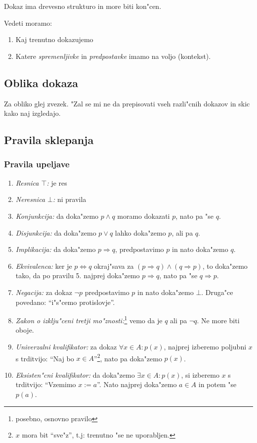 Dokaz ima drevesno strukturo in more biti kon"cen.

Vedeti moramo:
\begin{enumerate}
	\item Kaj trenutno dokazujemo
	\item Katere \emph{spremenljivke} in \emph{predpostavke} imamo na voljo (kontekst).
\end{enumerate}

\subsection{Oblika dokaza}
Za obliko glej zvezek. "Zal se mi ne da prepisovati vseh razli"cnih dokazov in skic kako naj izgledajo.

\subsection{Pravila sklepanja}
\subsubsection{Pravila upeljave}
\begin{enumerate}
	\item \emph{Resnica $\top$:} je res
	\item \emph{Neresnica $\bot$:} ni pravila
	\item \emph{Konjunkcija:} da doka"zemo $p \land q$ moramo dokazati $p$, nato pa "se $q$.
	\item \emph{Disjunkcija:} da doka"zemo $p \lor q$ lahko doka"zemo $p$, ali pa $q$.
	\item \emph{Implikacija:} da doka"zemo $p \Rightarrow q$, predpostavimo $p$ in nato doka"zemo $q$.
	\item \emph{Ekvivalenca:} ker je $p \Leftrightarrow q$ okraj"sava za $(p \Rightarrow q) \land (q \Rightarrow p)$, to doka"zemo tako, da po pravilu 5. najprej doka"zemo $p \Rightarrow q$, nato pa "se $q \Rightarrow p$.
	\item \emph{Negacija:} za dokaz $\lnot p$ predpostavimo $p$ in nato doka"zemo $\bot$. Druga"ce povedano: ``i"s"cemo protislovje''.
	\item \emph{Zakon o izklju"ceni tretji mo"znosti:}\footnote{posebno, osnovno pravilo} vemo da je $q$ ali pa $\lnot q$. Ne more biti oboje.
	\item \emph{Univerzalni kvalifikator:} za dokaz $\forall x \in A: p(x)$, najprej izberemo poljubni $x$ s trditvijo: ``Naj bo $x \in A$''\footnote{$x$ mora bit ``sve"z'', t.j: trenutno "se ne uporabljen.}, nato pa doka"zemo $p(x)$.
	\item \emph{Eksisten"cni kvalifikator:} da doka"zemo $\exists x \in A: p(x)$, si izberemo $x$ s trditvijo: ``Vzemimo $x := a$''. Nato najprej doka"zemo $a \in A$ in potem "se $p(a)$.
\end{enumerate}

